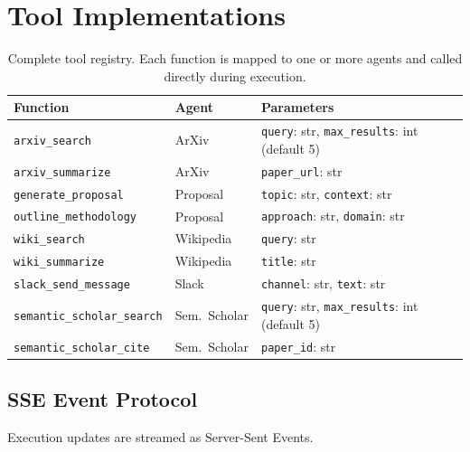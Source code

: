 \documentclass[sigconf, anonymous]{acmart}
\begin{document}
\section{Tool Implementations}
\label{app:tools}

\begin{table}[t]
  \caption{Complete tool registry. Each function is mapped to one or more agents and called directly during execution.}
  \label{tab:tools}
  \small
  \begin{tabular}{p{} p{} p{}}
    \toprule
    Function & Agent & Parameters \\
    \midrule
    \texttt{arxiv\_search} & ArXiv & \texttt{query}: str, \texttt{max\_results}: int (default 5) \\
    \texttt{arxiv\_summarize} & ArXiv & \texttt{paper\_url}: str \\
    \texttt{generate\_proposal} & Proposal & \texttt{topic}: str, \texttt{context}: str \\
    \texttt{outline\_methodology} & Proposal & \texttt{approach}: str, \texttt{domain}: str \\
    \texttt{wiki\_search} & Wikipedia & \texttt{query}: str \\
    \texttt{wiki\_summarize} & Wikipedia & \texttt{title}: str \\
    \texttt{slack\_send\_message} & Slack & \texttt{channel}: str, \texttt{text}: str \\
    \texttt{semantic\_scholar\_search} & Sem.\ Scholar & \texttt{query}: str, \texttt{max\_results}: int (default 5) \\
    \texttt{semantic\_scholar\_cite} & Sem.\ Scholar & \texttt{paper\_id}: str \\
    \bottomrule
  \end{tabular}
\end{table}


\subsection{SSE Event Protocol}

Execution updates are streamed as Server-Sent Events.
\end{document}
